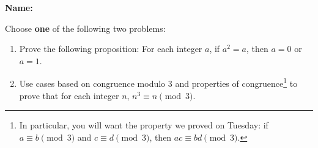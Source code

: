\documentclass[12pt]{article}
\begin{document}
{\bf Name:}
\thispagestyle{fancy}

\bigskip
Choose {\bf one} of the following two problems:
\begin{enumerate}
 \item Prove the following proposition: For each integer $a$, if $a^2=a$, then $a=0$ or $a=1$.
 \item Use cases based on congruence modulo 3 and properties of congruence\footnote{In particular, you will want the property we proved on Tuesday: if $a\equiv b \pmod{3}$ and $c\equiv d\pmod{3}$, then $ac\equiv bd\pmod{3}$.} to prove that for each integer $n$, $n^3\equiv n \pmod{3}$.

\end{enumerate}
\end{document}
